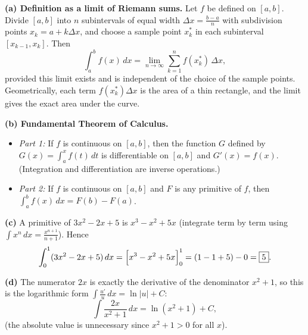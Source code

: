 \documentclass[11pt]{article}
\begin{document}
\begin{corrige}
\textbf{(a) Definition as a limit of Riemann sums.} Let $f$ be defined on $[a,b]$. Divide $[a,b]$ into $n$ subintervals of equal width $\Delta x = \frac{b-a}{n}$ with subdivision points $x_k = a + k\Delta x$, and choose a sample point $x_k^{*}$ in each subinterval $[x_{k-1}, x_k]$. Then
\[
\int_a^b f(x)\,dx = \lim_{n\to\infty} \sum_{k=1}^{n} f(x_k^{*})\,\Delta x,
\]
provided this limit exists and is independent of the choice of the sample points. Geometrically, each term $f(x_k^{*})\Delta x$ is the area of a thin rectangle, and the limit gives the exact area under the curve.

\textbf{(b) Fundamental Theorem of Calculus.}
\begin{itemize}
\item \emph{Part 1:} If $f$ is continuous on $[a,b]$, then the function $G$ defined by $G(x) = \displaystyle\int_a^x f(t)\,dt$ is differentiable on $[a,b]$ and $G'(x) = f(x)$. (Integration and differentiation are inverse operations.)
\item \emph{Part 2:} If $f$ is continuous on $[a,b]$ and $F$ is any primitive of $f$, then $\displaystyle\int_a^b f(x)\,dx = F(b) - F(a)$.
\end{itemize}

\textbf{(c)} A primitive of $3x^2 - 2x + 5$ is $x^3 - x^2 + 5x$ (integrate term by term using $\int x^n\,dx = \frac{x^{n+1}}{n+1}$). Hence
\[
\int_0^1 (3x^2 - 2x + 5)\,dx = \Bigl[x^3 - x^2 + 5x\Bigr]_0^1 = (1 - 1 + 5) - 0 = \boxed{5}.
\]

\textbf{(d)} The numerator $2x$ is exactly the derivative of the denominator $x^2+1$, so this is the logarithmic form $\int \frac{u'}{u}\,dx = \ln|u| + C$:
\[
\int \frac{2x}{x^2+1}\,dx = \ln(x^2+1) + C,
\]
(the absolute value is unnecessary since $x^2+1 > 0$ for all $x$).
\end{corrige}
\end{document}
